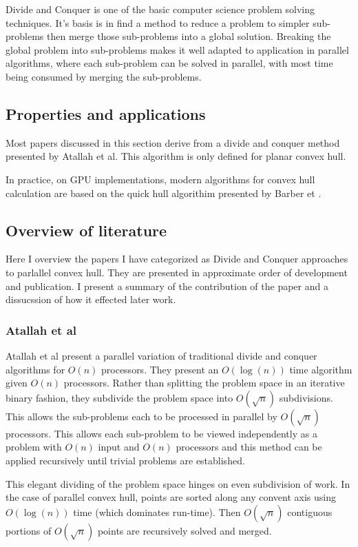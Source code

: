 \documentclass[10pt,a4paper,draft]{report}
\begin{document}
Divide and Conquer is one of the basic computer science problem solving techniques. It's basis is in find a method to reduce a problem to simpler sub-problems then merge those sub-problems into a global solution. Breaking the global problem into sub-problems makes it well adapted to application in parallel algorithms, where each sub-problem can be solved in parallel, with most time being consumed by merging the sub-problems.


\subsection{Properties and applications}

Most papers discussed in this section derive from a divide and conquer method presented by Atallah et al.
This algorithm is only defined for planar convex hull.

In practice, on GPU implementations, modern algorithms for convex hull calculation are based on the quick hull algorithim presented by Barber et .
\subsection{Overview of literature}
Here I overview the papers I have categorized as Divide and Conquer approaches to parlallel convex hull. They are presented in approximate order of development and publication. I present a summary of the contribution of the paper and a dissucssion of how it effected later work.
\subsubsection{Atallah et al}
Atallah et al present a parallel variation of traditional divide and conquer algorithms for $O(n)$ processors. They present an $O(\log(n))$ time algorithm given $O(n)$ processors. Rather than splitting the problem space in an iterative binary fashion, they subdivide the problem space into $O(\sqrt{n})$ subdivisions. This allows the sub-problems each to be processed in parallel by $O(\sqrt{n})$ processors. This allows each sub-problem to be viewed independently as a problem with $O(n)$ input and $O(n)$ processors and this method can be applied recursively until trivial problems are established.

This elegant dividing of the problem space hinges on even subdivision of work. In the case of parallel convex hull, points are sorted along any convent axis using $O(\log(n))$ time (which dominates run-time).
Then $O(\sqrt{n})$ contiguous portions of $O(\sqrt{n})$ points are recursively solved and merged.
\end{document}

